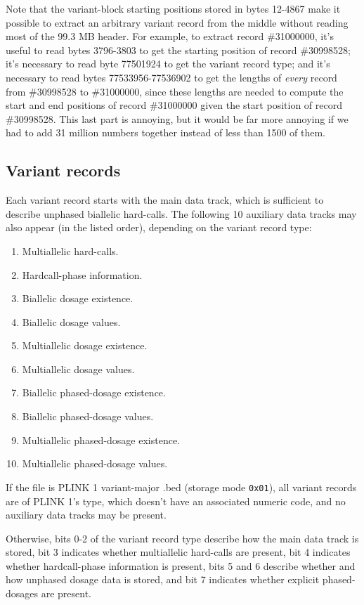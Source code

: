\documentclass[8pt]{article}
\begin{document}
Note that the variant-block starting positions stored in bytes 12-4867 make it
possible to extract an arbitrary variant record from the middle without reading
most of the 99.3 MB header.  For example, to extract record \#31000000, it's
useful to read bytes 3796-3803 to get the starting position of record
\#30998528; it's necessary to read byte 77501924 to get the variant record
type; and it's necessary to read bytes 77533956-77536902 to get the lengths of
\textit{every} record from \#30998528 to \#31000000, since these lengths are
needed to compute the start and end positions of record \#31000000 given the
start position of record \#30998528.  This last part is annoying, but it would
be far more annoying if we had to add 31 million numbers together instead of
less than 1500 of them.

\subsection{Variant records}
\label{sec:vr}

Each variant record starts with the main data track, which is sufficient to
describe unphased biallelic hard-calls.  The following 10 auxiliary data tracks
may also appear (in the listed order), depending on the variant record type:

\begin{enumerate}
\item Multiallelic hard-calls.
\item Hardcall-phase information.
\item Biallelic dosage existence.
\item Biallelic dosage values.
\item Multiallelic dosage existence.
\item Multiallelic dosage values.
\item Biallelic phased-dosage existence.
\item Biallelic phased-dosage values.
\item Multiallelic phased-dosage existence.
\item Multiallelic phased-dosage values.
\end{enumerate}

If the file is PLINK 1 variant-major .bed (storage mode \texttt{0x01}), all
variant records are of PLINK 1's type, which doesn't have an associated numeric
code, and no auxiliary data tracks may be present.

Otherwise, bits 0-2 of the variant record type describe how the main data track
is stored, bit 3 indicates whether multiallelic hard-calls are present, bit 4
indicates whether hardcall-phase information is present, bits 5 and 6 describe
whether and how unphased dosage data is stored, and bit 7 indicates whether
explicit phased-dosages are present.
\end{document}
